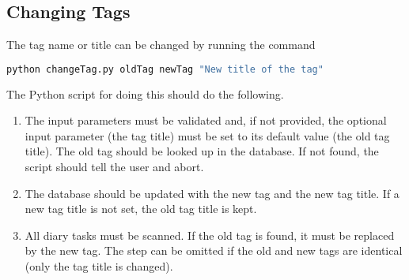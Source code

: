 \subsection{Changing Tags}
\label{task:20140824_jkn0}
The tag name or title can be changed by running the command
\begin{lstlisting}[language=bash]
python changeTag.py oldTag newTag "New title of the tag"
\end{lstlisting}
The Python script for doing this should do the following.
\begin{enumerate}
    \item The input parameters must be validated and, if not provided, the optional input parameter (the tag title) must be set to its default value (the old tag title). The old tag should be looked up in the database. If not found, the script should tell the user and abort.
    \item The database should be updated with the new tag and the new tag title. If a new tag title is not set, the old tag title is kept.
    \item All diary tasks must be scanned. If the old tag is found, it must be replaced by the new tag. The step can be omitted if the old and new tags are identical (only the tag title is changed).
\end{enumerate}

